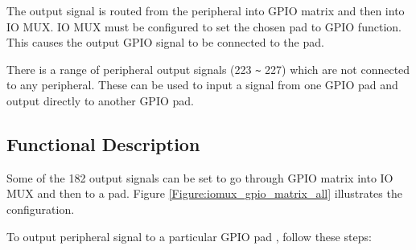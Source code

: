 \documentclass[main\_\_EN.tex]{subfiles}
\begin{document}
The output signal is routed from the peripheral into GPIO matrix and then into IO MUX. IO MUX must be configured to set the chosen pad to GPIO function. This causes the output GPIO signal to be connected to the pad.

\begin{tiplisting}
There is a range of peripheral output signals (223 \verb+~+ 227) which are not connected to any peripheral. These can be used to input a signal from one GPIO pad and output directly to another GPIO pad.
\end{tiplisting}
\vspace{-2em}
\subsection{Functional Description}\label{IOMUXPeripheralOutput}

Some of the 182 output signals can be set to go through GPIO matrix into IO MUX and then to a pad. Figure  \ref{Figure:iomux_gpio_matrix_all} illustrates the configuration.

To output peripheral signal  to a particular GPIO pad , follow these steps:
\end{document}
